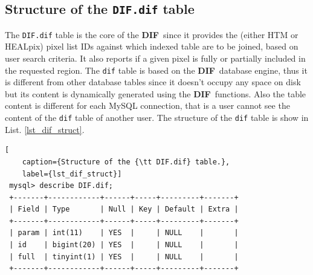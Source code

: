 \documentclass[10pt,titlepage]{article}
\newcommand{\dif}{\textbf{\small DIF}}
\begin{document}
\subsection{Structure of the \texttt{DIF.dif} table}
The {\tt DIF.dif} table is the core of the \dif\ since it provides the
(either HTM or HEALpix) pixel list IDs against which indexed table are
to be joined, based on user search criteria. It also reports if a
given pixel is fully or partially included in the requested
region. The \texttt{dif} table is based on the \dif\ database engine,
thus it is different from other database tables since it doesn't
occupy any space on disk but its content is dynamically generated
using the \dif\ functions. Also the table content is different for each
MySQL connection, that is a user cannot see the content of the
\texttt{dif} table of another user. 
The structure of the \texttt{dif} table is show in
List. \ref{lst_dif_struct}.
\begin{lstlisting}[
    caption={Structure of the {\tt DIF.dif} table.},
    label={lst_dif_struct}]
 mysql> describe DIF.dif;
 +-------+------------+------+-----+---------+-------+
 | Field | Type       | Null | Key | Default | Extra |
 +-------+------------+------+-----+---------+-------+
 | param | int(11)    | YES  |     | NULL    |       |
 | id    | bigint(20) | YES  |     | NULL    |       | 
 | full  | tinyint(1) | YES  |     | NULL    |       | 
 +-------+------------+------+-----+---------+-------+
\end{lstlisting}
\end{document}
